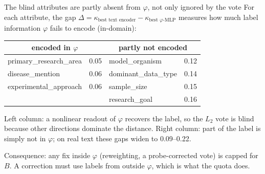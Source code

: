 \documentclass[11pt,aspectratio=169]{beamer}
\begin{document}
\begin{frame}{The blind attributes are partly absent from $\varphi$, not only ignored by the vote}
For each attribute, the gap $\Delta = \kappa_{\text{best text encoder}} - \kappa_{\text{best }\varphi\text{-MLP}}$ measures how much label information $\varphi$ fails to encode (in-domain):

\medskip
\centering\small
\begin{tabular}{lc@{\qquad}lc}
\toprule
\multicolumn{2}{c}{encoded in $\varphi$} & \multicolumn{2}{c}{partly not encoded}\\
\midrule
primary\_research\_area & 0.05 & model\_organism & 0.12\\
disease\_mention        & 0.06 & \alert{dominant\_data\_type} & \alert{0.14}\\
experimental\_approach  & 0.06 & \alert{sample\_size} & \alert{0.15}\\
                        &      & research\_goal & 0.16\\
\bottomrule
\end{tabular}

\raggedright
\medskip
Left column: a nonlinear readout of $\varphi$ recovers the label, so the $L_2$ vote is blind because other directions dominate the distance. Right column: part of the label is simply not in $\varphi$; on real text these gaps widen to 0.09--0.22.

\medskip
Consequence: any fix inside $\varphi$ (reweighting, a probe-corrected vote) is capped for $B$. A correction must use labels from outside $\varphi$, which is what the quota does.
\end{frame}
\end{document}
